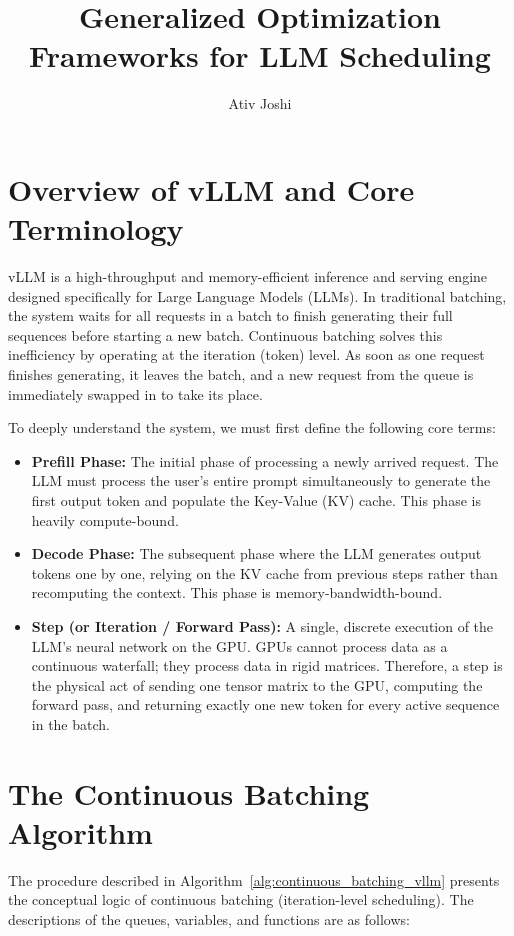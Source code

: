 \documentclass[11pt]{article}
\title{Generalized Optimization Frameworks for LLM Scheduling}
\author{Ativ Joshi}
\date{}
\begin{document}
\maketitle

\section{Overview of vLLM and Core Terminology}
\label{sec:vllm_overview}

vLLM is a high-throughput and memory-efficient inference and serving engine designed specifically for Large Language Models (LLMs). In traditional batching, the system waits for all requests in a batch to finish generating their full sequences before starting a new batch. Continuous batching solves this inefficiency by operating at the iteration (token) level. As soon as one request finishes generating, it leaves the batch, and a new request from the queue is immediately swapped in to take its place.

To deeply understand the system, we must first define the following core terms:
\begin{itemize}
    \item \textbf{Prefill Phase:} The initial phase of processing a newly arrived request. The LLM must process the user's entire prompt simultaneously to generate the first output token and populate the Key-Value (KV) cache. This phase is heavily compute-bound.
    \item \textbf{Decode Phase:} The subsequent phase where the LLM generates output tokens one by one, relying on the KV cache from previous steps rather than recomputing the context. This phase is memory-bandwidth-bound.
    \item \textbf{Step (or Iteration / Forward Pass):} A single, discrete execution of the LLM's neural network on the GPU. GPUs cannot process data as a continuous waterfall; they process data in rigid matrices. Therefore, a step is the physical act of sending one tensor matrix to the GPU, computing the forward pass, and returning exactly one new token for every active sequence in the batch.
\end{itemize}

\section{The Continuous Batching Algorithm}
\label{sec:continuous_batching_algorithm}

The procedure described in Algorithm~\ref{alg:continuous_batching_vllm} presents the conceptual logic of continuous batching (iteration-level scheduling). The descriptions of the queues, variables, and functions are as follows:
\end{document}
